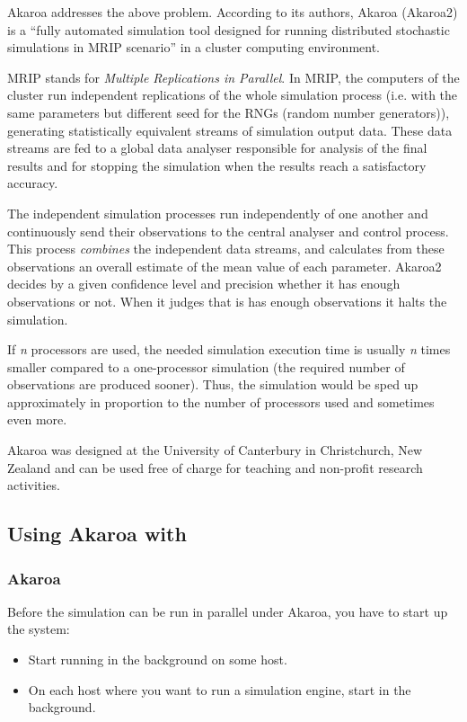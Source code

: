 Akaroa \cite{Akaroa99} addresses the above problem.
According to its authors, Akaroa (Akaroa2) is a ``fully automated
simulation tool designed for running distributed stochastic simulations
in MRIP scenario'' in a cluster computing environment.

MRIP stands for \textit{Multiple Replications in Parallel}.
In MRIP, the computers of the cluster run independent replications
of the whole simulation process (i.e. with the same parameters but
different seed for the RNGs (random number generators)),
generating statistically equivalent streams of simulation output data.
These data streams are fed to a global data analyser responsible for
analysis of the final results and for stopping the simulation
when the results reach a satisfactory accuracy.

The independent simulation processes run independently of one another
and continuously send their observations to the central analyser
and control process. This process \textit{combines} the independent data streams,
and calculates from these observations an overall estimate of the mean value
of each parameter.
Akaroa2 decides by a given confidence level and precision
whether it has enough observations or not. When it judges that is
has enough observations it halts the simulation.

If \textit{n} processors are used, the needed simulation execution time
is usually \textit{n} times smaller compared to a one-processor
simulation (the required number of observations are produced sooner).
Thus, the simulation would be sped up approximately in proportion
to the number of processors used and sometimes even more.

Akaroa was designed at the University of Canterbury in Christchurch, New Zealand
and can be used free of charge for teaching and non-profit research activities.


\subsection{Using Akaroa with {\opp}}

\subsubsection{Akaroa}

Before the simulation can be run in parallel under Akaroa, you have to
start up the system:

\begin{itemize}
  \item{Start  running in the background on some host.}
  \item{On each host where you want to run a simulation engine,
     start  in the background.}
\end{itemize}

